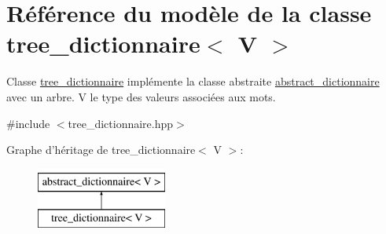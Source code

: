 \hypertarget{classtree__dictionnaire}{\section{Référence du modèle de la classe tree\-\_\-dictionnaire$<$ V $>$}
\label{classtree__dictionnaire}
}


Classe \hyperlink{classtree__dictionnaire}{tree\-\_\-dictionnaire} implémente la classe abstraite \hyperlink{classabstract__dictionnaire}{abstract\-\_\-dictionnaire} avec un arbre. V le type des valeurs associées aux mots.  




{\ttfamily \#include $<$tree\-\_\-dictionnaire.\-hpp$>$}

Graphe d'héritage de tree\-\_\-dictionnaire$<$ V $>$\-:\begin{figure}[H]
\begin{center}
\leavevmode
\includegraphics[height=2.000000cm]{classtree__dictionnaire}
\end{center}
\end{figure}
